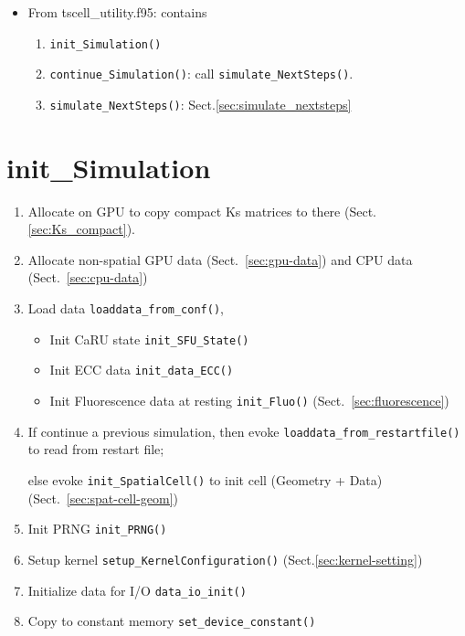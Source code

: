 \begin{itemize}
\begin{enumerate}
\item Initialize data for simulation \verb!init_Simulation()!
(Sect.\ref{sec:spatial_init_simul})
\item Run simulation \verb!continue_Simulation()! (Sect.\ref{sec:continue_simulation})
\end{enumerate}
  
  \item From tscell\_utility.f95: contains
  \begin{enumerate}
    \item \verb!init_Simulation()!
    \item \verb!continue_Simulation()!: call \verb!simulate_NextSteps()!.
    \item \verb!simulate_NextSteps()!: Sect.\ref{sec:simulate_nextsteps}
  \end{enumerate}
\end{itemize}

\section{init\_Simulation}
\label{sec:spatial_init_simul}

  \begin{enumerate}
    \item Allocate on GPU to copy compact Ks matrices to there
    (Sect.\ref{sec:Ks_compact}).
	\item Allocate non-spatial GPU data (Sect.~\ref{sec:gpu-data}) and CPU data
    (Sect.~\ref{sec:cpu-data})
    \item Load data \verb!loaddata_from_conf()!,
    \begin{itemize}
    \item Init CaRU state \verb!init_SFU_State()!
    \item Init ECC data \verb!init_data_ECC()!
    \item Init Fluorescence data at resting \verb!init_Fluo()!
      (Sect.~\ref{sec:fluorescence})
    \end{itemize}

  \item If continue a previous simulation, then evoke
    \verb!loaddata_from_restartfile()! to read from restart file;
    
    else evoke \verb!init_SpatialCell()! to init cell (Geometry + Data)
    (Sect.~\ref{sec:spat-cell-geom})
  
  
  \item Init PRNG \verb!init_PRNG()! \item Setup kernel
  \verb!setup_KernelConfiguration()! (Sect.\ref{sec:kernel-setting}) \item
  Initialize data for I/O \verb!data_io_init()! \item Copy to constant memory
  \verb!set_device_constant()!
  \end{enumerate}


